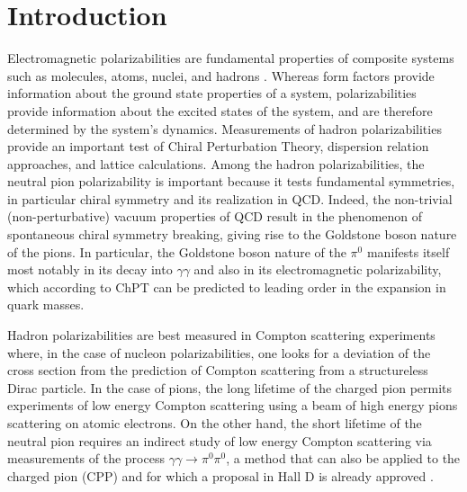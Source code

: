 \section{Introduction}

Electromagnetic polarizabilities are fundamental properties of
composite systems such as molecules, atoms, nuclei, and hadrons
\cite{Holstein:1990qy}. Whereas form factors provide information
about the ground state properties of a system, polarizabilities
provide information about the excited states of the system, and are
  therefore determined by the system's dynamics.
Measurements of hadron polarizabilities provide an important test
of Chiral Perturbation Theory, dispersion relation approaches,
and lattice calculations. Among the hadron polarizabilities, the
neutral pion polarizability is important because it
tests fundamental symmetries, in particular chiral symmetry and its
realization in QCD.  Indeed, the non-trivial (non-perturbative) vacuum
properties of QCD result in the phenomenon of spontaneous chiral
symmetry breaking, giving rise to the Goldstone boson nature of the
pions.  In particular, the Goldstone boson nature of the $\pi^0$
manifests itself most notably in its decay into $\gamma\gamma$ and
also in its electromagnetic polarizability, which according to ChPT
can be predicted to leading order in the expansion in quark
masses.


Hadron polarizabilities are best measured in Compton scattering
experiments where, in the case of nucleon polarizabilities, one looks
for a deviation of the cross section from the prediction of Compton
scattering from a structureless Dirac particle.
In the case of pions, the long lifetime of the charged pion permits
experiments of low energy Compton scattering using a beam of high
energy pions scattering on atomic electrons. On the other hand, the
short lifetime of the neutral pion requires an indirect study of low
energy Compton scattering via measurements of the process $\gamma
\gamma \rightarrow \pi^0 \pi^0$, a method that can also be applied to
the charged pion (CPP) and for which a proposal in Hall D is already
approved \cite{CPPexp}.

